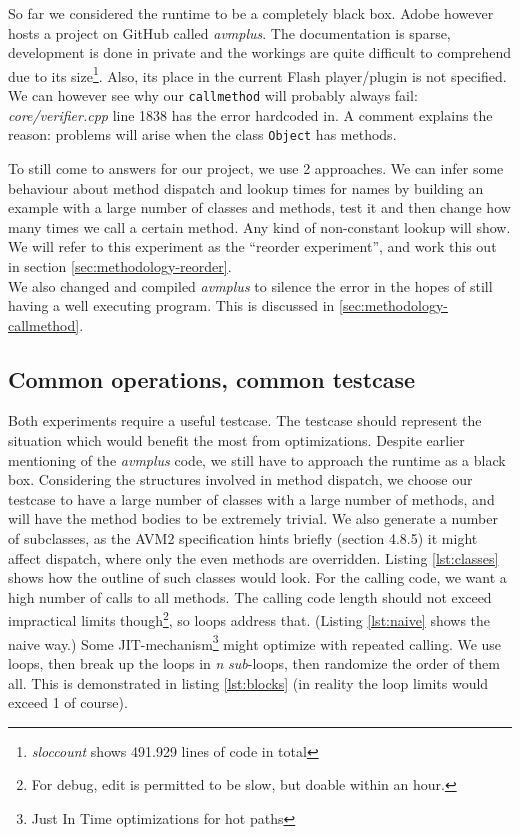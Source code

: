 \documentclass[a4paper,11pt]{scrartcl}
\begin{document}
So far we considered the runtime to be a completely black box. Adobe however hosts a project on GitHub called \textit{avmplus}. The documentation is sparse, development is done in private and the workings are quite difficult to comprehend due to its size\footnote{\textit{sloccount} shows 491.929 lines of code in total}. Also, its place in the current Flash player/plugin is not specified. We can however see why our \texttt{callmethod} will probably always fail: \textit{core/verifier.cpp} line 1838 has the error hardcoded in. A comment explains the reason: problems will arise when the class \texttt{Object} has methods.

To still come to answers for our project, we use 2 approaches. We can infer some behaviour about method dispatch and lookup times for names by building an example with a large number of classes and methods, test it and then change how many times we call a certain method. Any kind of non-constant lookup will show. We will refer to this experiment as the ``reorder experiment'',  and work this out in section \ref{sec:methodology-reorder}. \\
We also changed and compiled \textit{avmplus} to silence the error in the hopes of still having a well executing program. This is discussed in \ref{sec:methodology-callmethod}. 

\subsection{Common operations, common testcase}
\label{sec:methodology-common}
Both experiments require a useful testcase. The testcase should represent the situation which would benefit the most from optimizations. Despite earlier mentioning of the \textit{avmplus} code, we still have to approach the runtime as a black box. Considering the structures involved in method dispatch, we choose our testcase to have a large number of classes with a large number of methods, and will have the method bodies to be extremely trivial. We also generate a number of subclasses, as the AVM2 specification hints briefly (section 4.8.5) it might affect dispatch, where only the even methods are overridden. Listing \ref{lst:classes} shows how the outline of such classes would look. For the calling code, we want a high number of calls to all methods. The calling code length should not exceed impractical limits though\footnote{For debug, edit is permitted to be slow, but doable within an hour.}, so loops address that. (Listing \ref{lst:naive} shows the naive way.) Some JIT-mechanism\footnote{Just In Time optimizations for hot paths} might optimize with repeated calling. We use loops, then break up the loops in \textit{n} \textit{sub}-loops, then randomize the order of them all. This is demonstrated in listing \ref{lst:blocks} (in reality the loop limits would exceed 1 of course).
\end{document}
